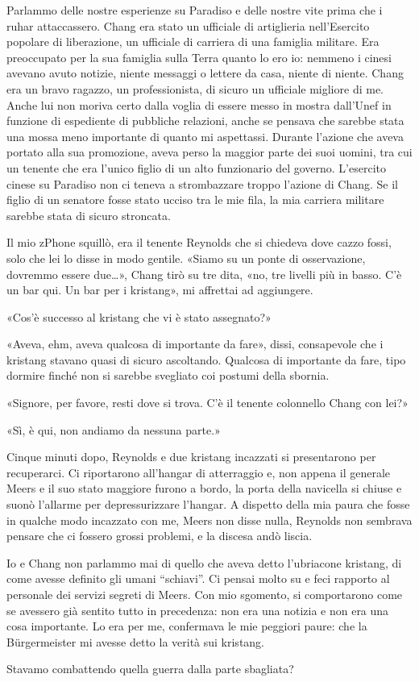 Parlammo delle nostre esperienze su Paradiso e delle nostre vite prima
che i ruhar attaccassero. Chang era stato un ufficiale di artiglieria
nell'Esercito popolare di liberazione, un ufficiale di carriera di una
famiglia militare. Era preoccupato per la sua famiglia sulla Terra
quanto lo ero io: nemmeno i cinesi avevano avuto notizie, niente
messaggi o lettere da casa, niente di niente. Chang era un bravo
ragazzo, un professionista, di sicuro un ufficiale migliore di me. Anche
lui non moriva certo dalla voglia di essere messo in mostra dall'Unef in
funzione di espediente di pubbliche relazioni, anche se pensava che
sarebbe stata una mossa meno importante di quanto mi aspettassi. Durante
l'azione che aveva portato alla sua promozione, aveva perso la maggior
parte dei suoi uomini, tra cui un tenente che era l'unico figlio di un
alto funzionario del governo. L'esercito cinese su Paradiso non ci
teneva a strombazzare troppo l'azione di Chang. Se il figlio di un
senatore fosse stato ucciso tra le mie fila, la mia carriera militare
sarebbe stata di sicuro stroncata.

Il mio zPhone squillò, era il tenente Reynolds che si chiedeva dove
cazzo fossi, solo che lei lo disse in modo gentile. «Siamo su un ponte
di osservazione, dovremmo essere due\ldots», Chang tirò su tre dita,
«no, tre livelli più in basso. C'è un bar qui. Un bar per i kristang»,
mi affrettai ad aggiungere.

«Cos'è successo al kristang che vi è stato assegnato?»

«Aveva, ehm, aveva qualcosa di importante da fare», dissi, consapevole
che i kristang stavano quasi di sicuro ascoltando. Qualcosa di
importante da fare, tipo dormire finché non si sarebbe svegliato coi
postumi della sbornia.

«Signore, per favore, resti dove si trova. C'è il tenente colonnello
Chang con lei?»

«Sì, è qui, non andiamo da nessuna parte.»

Cinque minuti dopo, Reynolds e due kristang incazzati si presentarono
per recuperarci. Ci riportarono all'hangar di atterraggio e, non appena
il generale Meers e il suo stato maggiore furono a bordo, la porta della
navicella si chiuse e suonò l'allarme per depressurizzare l'hangar. A
dispetto della mia paura che fosse in qualche modo incazzato con me,
Meers non disse nulla, Reynolds non sembrava pensare che ci fossero
grossi problemi, e la discesa andò liscia.

Io e Chang non parlammo mai di quello che aveva detto l'ubriacone
kristang, di come avesse definito gli umani ``schiavi''. Ci pensai molto
su e feci rapporto al personale dei servizi segreti di Meers. Con mio
sgomento, si comportarono come se avessero già sentito tutto in
precedenza: non era una notizia e non era una cosa importante. Lo era
per me, confermava le mie peggiori paure: che la Bürgermeister mi avesse
detto la verità sui kristang.

Stavamo combattendo quella guerra dalla parte sbagliata?
